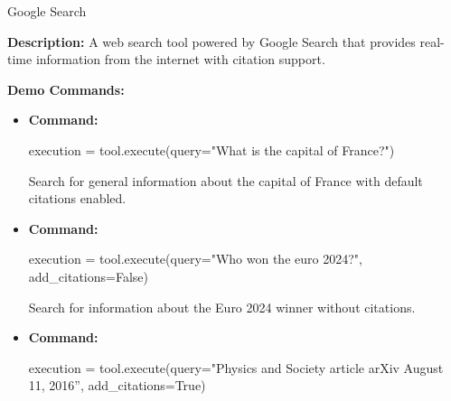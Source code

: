 \begin{tooldescbox}{{Google Search}}
\setlength{\parindent}{0pt}
\setlength{\parskip}{4pt}

\textbf{Description:} A web search tool powered by Google Search that provides real-time information from the internet with citation support.

\vspace{6pt}


\vspace{4pt}


\vspace{4pt}


\vspace{6pt}

\textbf{Demo Commands:}
\begin{itemize}[left=0pt, label={}, itemsep=0pt, parsep=0pt]
\item \textbf{Command:} 
\begin{simplecode}
{{execution = tool.execute(query="What is the capital of France?")}}
\end{simplecode}

    \enspace{} Search for general information about the capital of France with default citations enabled.
    
    \vspace{4pt}
    

    \item \textbf{Command:} 
    \begin{simplecode}
    {{execution = tool.execute(query="Who won the euro 2024?", add\_citations=False)}}
    \end{simplecode}

    \enspace{} Search for information about the Euro 2024 winner without citations.
    
    \vspace{4pt}
    

    \item \textbf{Command:} 
    \begin{simplecode}
    {{execution = tool.execute(query="Physics and Society article arXiv August 11, 2016”, add\_citations=True)}}
    \end{simplecode}


\end{itemize}
\end{tooldescbox}
